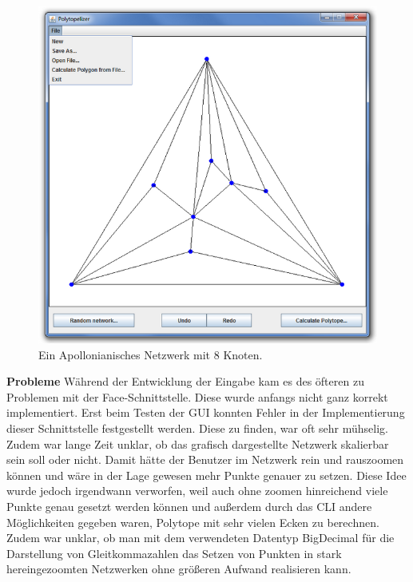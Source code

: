 \begin{figure}[htbp]
	\centering
	\includegraphics[scale=0.5]{figures/input.png}
	\caption{Ein Apollonianisches Netzwerk mit 8 Knoten.}
	\label{apollNet}
\end{figure}

\textbf{Probleme} Während der Entwicklung der Eingabe kam es des öfteren zu Problemen mit der Face-Schnittstelle. Diese wurde anfangs nicht ganz korrekt implementiert. Erst beim Testen der GUI konnten Fehler in der Implementierung dieser Schnittstelle festgestellt werden. Diese zu finden, war oft sehr mühselig. Zudem war lange Zeit unklar, ob das grafisch dargestellte Netzwerk skalierbar sein soll oder nicht. Damit hätte der Benutzer im Netzwerk rein und rauszoomen können und wäre in der Lage gewesen mehr Punkte genauer zu setzen. Diese Idee wurde jedoch irgendwann verworfen, weil auch ohne zoomen hinreichend viele Punkte genau gesetzt werden können und außerdem durch das CLI andere Möglichkeiten gegeben waren, Polytope mit sehr vielen Ecken zu berechnen. Zudem war unklar, ob man mit dem verwendeten Datentyp BigDecimal für die Darstellung von Gleitkommazahlen das Setzen von Punkten in stark hereingezoomten Netzwerken ohne größeren Aufwand realisieren kann.


